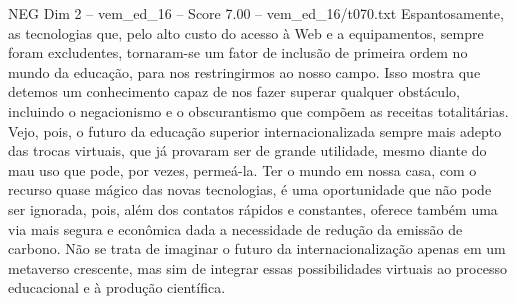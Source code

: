 \begin{textsample}{NEG Dim 2 – vem\_ed\_16 – Score 7.00 – vem\_ed\_16/t070.txt}
Espantosamente, as tecnologias que, pelo alto custo do acesso à Web e a equipamentos, sempre foram excludentes, tornaram-se um fator de inclusão de primeira ordem no mundo da educação, para nos restringirmos ao nosso campo.
Isso mostra que detemos um conhecimento capaz de nos fazer superar qualquer obstáculo, incluindo o negacionismo e o obscurantismo que compõem as receitas totalitárias.
Vejo, pois, o futuro da educação superior internacionalizada sempre mais adepto das trocas virtuais, que já provaram ser de grande utilidade, mesmo diante do mau uso que pode, por vezes, permeá-la.
Ter o mundo em nossa casa, com o recurso quase mágico das novas tecnologias, é uma oportunidade que não pode ser ignorada, pois, além dos contatos rápidos e constantes, oferece também uma via mais segura e econômica dada a necessidade de redução da emissão de carbono.
Não se trata de imaginar o futuro da internacionalização apenas em um metaverso crescente, mas sim de integrar essas possibilidades virtuais ao processo educacional e à produção científica.

\end{textsample}
